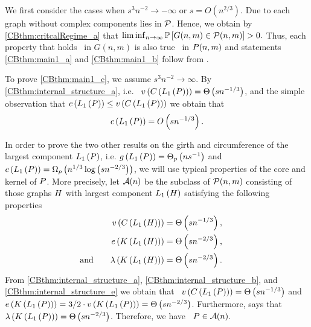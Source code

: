 \label{CBproofof:thm:general}
We first consider the cases when $s^3n^{-2} \to -\infty$ or $s=O\left(n^{2/3}\right)$. Due to  each graph without complex components lies in $\mathcal{P}$. Hence, we obtain by \ref{CBthm:critcalRegime_a} that
$
\liminf_{n \to \infty} \mathbb{P}\left[G(n,m) \in \mathcal{P}(n,m)\right]>0.
$
Thus, each property that holds \whp\ in $G(n,m)$ is also true \whp\ in $P(n,m)$ and statements \ref{CBthm:main1_a} and \ref{CBthm:main1_b} follow from .

To prove \ref{CBthm:main1_c}, we assume $s^3n^{-2}\to \infty$. By \ref{CBthm:internal_structure_a}, i.e. \whp\ $v\left({C\left(L_1\left(P\right)\right)}\right)=\Theta\left(sn^{-1/3}\right)$, and the simple observation that $c\left({L_1\left(P\right)}\right)\leq v\left({C\left(L_1\left(P\right)\right)}\right)$ we obtain that \whp\ \[c\left({L_1\left(P\right)}\right)=O\left(sn^{-1/3}\right).\]

In order to prove the two other results on the girth and circumference of the largest component $L_1\left(P\right)$, i.e. $g\left({L_1\left(P\right)}\right)=\Theta_p\left(n s^{-1}\right)$ 
and 
$c\left({L_1\left(P\right)}\right)=\Omega_p\left(n^{1/3}\log \left(sn^{-2/3}\right)\right)$, we will use typical properties of the core and kernel of $P$. More precisely, let $\mathcal{A}(n)$ be the subclass of $\mathcal{P}(n,m)$ consisting of those graphs $H$ with largest component $L_1\left(H\right)$ satisfying the following properties
\begin{align*}
	v\left({C\left(L_1\left(H\right)\right)}\right) &=\Theta \left(sn^{-1/3}\right), \\
	e\left({K\left(L_1\left(H\right)\right)}\right)&= \Theta \left(sn^{-2/3}\right),\\
	\text{ and }~~~~~ \lambda\left(K\left(L_1\left(H\right)\right)\right)&= \Theta \left(sn^{-2/3}\right).~~~~~
\end{align*}
From \ref{CBthm:internal_structure_a}, \ref{CBthm:internal_structure_b}, and \ref{CBthm:internal_structure_e} we obtain that \whp\ $v\left({C\left(L_1\left(P\right)\right)}\right)=\Theta\left(sn^{-1/3}\right)$ and $e\left({K\left(L_1\left(P\right)\right)}\right)=3/2\cdot v\left({K\left(L_1\left(P\right)\right)}\right)= \Theta \left(sn^{-2/3}\right)$.
Furthermore,  says that \whp\ $\lambda\left(K\left(L_1\left(P\right)\right)\right)=\Theta \left(sn^{-2/3}\right)$. Therefore, we have \whp\ $P \in \mathcal{A}(n)$.

